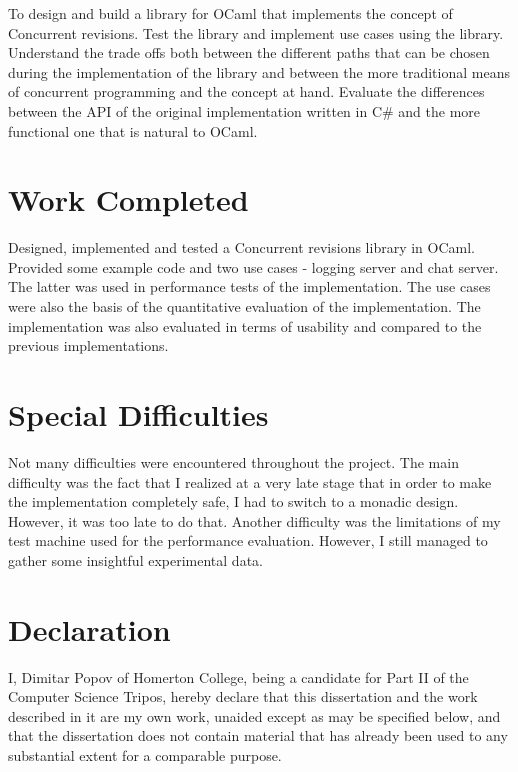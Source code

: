 \documentclass[12pt,twoside,notitlepage]{report}
\begin{document}
To design and build a library for OCaml that implements the concept of Concurrent revisions. Test the library and implement use cases using the library. Understand the trade offs both between the different paths that can be chosen during the implementation of the library and between the more traditional means of concurrent programming and the concept at hand. Evaluate the differences between the API of the original implementation written in C\#\cite{conrev} and the more functional one that is natural to OCaml. 


\section*{Work Completed}

Designed, implemented and tested a Concurrent revisions library in OCaml. Provided some example code and two use cases - logging server and chat server. The latter was used in performance tests of the implementation.
The use cases were also the basis of the quantitative evaluation of the implementation. The implementation was also evaluated in terms of usability and compared to the previous implementations.

\section*{Special Difficulties}

Not many difficulties were encountered throughout the project. The main difficulty was the fact that I realized at a very late stage that in order to make the implementation completely safe, I had to switch to a monadic design. However, it was too late to do that. Another difficulty was the limitations of my test machine used for the performance evaluation. However, I still managed to gather some insightful experimental data. 


 
\newpage
\section*{Declaration}

I, Dimitar Popov of Homerton College, being a candidate for Part II of the Computer
Science Tripos, hereby declare
that this dissertation and the work described in it are my own work,
unaided except as may be specified below, and that the dissertation
does not contain material that has already been used to any substantial
extent for a comparable purpose.
\end{document}

